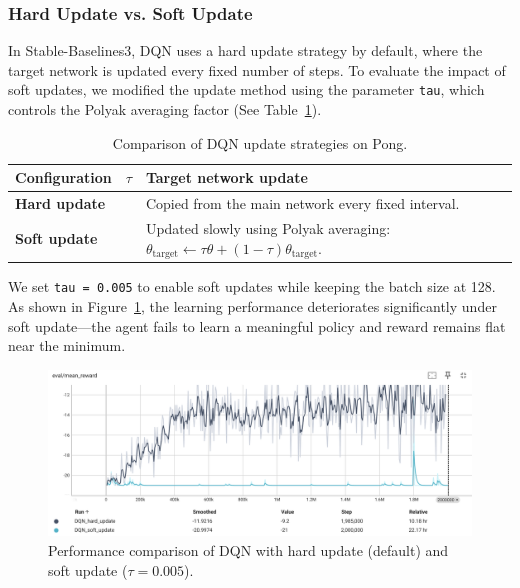 \documentclass[10pt,twocolumn,letterpaper]{article}
\begin{document}
\subsubsection{Hard Update vs. Soft Update}
In Stable-Baselines3, DQN uses a hard update strategy by default, where the target network is updated every fixed number of steps. To evaluate the impact of soft updates, we modified the update method using the parameter \texttt{tau}, which controls the Polyak averaging factor (See Table~\ref{tab:dqn_update}).

\begin{table}
  \centering
  \begin{tabular}{@{}l>{\centering\arraybackslash}p{1.5cm} >{\raggedright\arraybackslash}p{4.2cm}@{}}
    \toprule
    Configuration & $\tau$ & Target network update \\
    \midrule
    \textbf{Hard update} & 1.0 & Copied from the main network every fixed interval. \\
    \textbf{Soft update} & 0.005 & Updated slowly using Polyak averaging: $\theta_{\text{target}} \leftarrow \tau \theta + (1 - \tau)\theta_{\text{target}}$. \\
    \bottomrule
  \end{tabular}
  \caption{Comparison of DQN update strategies on Pong.}
  \label{tab:dqn_update}
\end{table}

We set \texttt{tau = 0.005} to enable soft updates while keeping the batch size at 128. As shown in Figure~\ref{fig:dqn_update}, the learning performance deteriorates significantly under soft update—the agent fails to learn a meaningful policy and reward remains flat near the minimum.

\begin{figure}[h]
  \centering
  \includegraphics[width=0.95\linewidth]{assets/4.4/Hard_vs_Soft.png}
  \caption{Performance comparison of DQN with hard update (default) and soft update ($\tau=0.005$).}
  \label{fig:dqn_update}
\end{figure}
\end{document}
